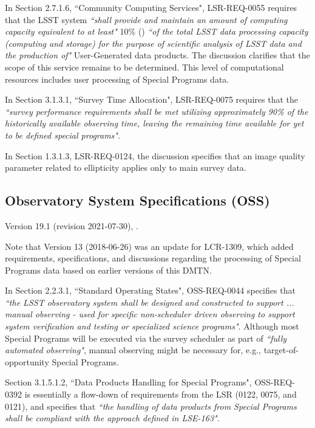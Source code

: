 In Section 2.7.1.6, ``Community Computing Services", LSR-REQ-0055 requires that the LSST system {\it ``shall provide and maintain an amount of computing capacity equivalent to at least"} 10\% () {\it ``of the total LSST data processing capacity (computing and storage) for the purpose of scientific analysis of LSST data and the production of"} User-Generated data products. 
The discussion clarifies that the scope of this service remains to be determined.
This level of computational resources includes user processing of Special Programs data.

In Section 3.1.3.1, ``Survey Time Allocation", LSR-REQ-0075 requires that the {\it ``survey performance requirements shall be met utilizing approximately 90\% of the historically available observing time, leaving the remaining time available for yet to be defined special programs"}.

In Section 1.3.1.3, LSR-REQ-0124, the discussion specifies that an image quality parameter related to ellipticity applies only to main survey data.



\subsection{Observatory System Specifications (OSS)}

Version 19.1 (revision 2021-07-30), .

Note that Version 13 (2018-06-26) was an update for LCR-1309, which added requirements, specifications, and discussions regarding the processing of Special Programs data based on earlier versions of this DMTN.

In Section 2.2.3.1, ``Standard Operating States", OSS-REQ-0044 specifies that {\it ``the LSST observatory system shall be designed and constructed to support ... manual observing - used for specific non-scheduler driven observing to support system verification and testing or specialized science programs"}.
Although most Special Programs will be executed via the survey scheduler as part of {\it ``fully automated observing"}, manual observing might be necessary for, e.g., target-of-opportunity Special Programs.

Section 3.1.5.1.2, ``Data Products Handling for Special Programs", OSS-REQ-0392 is essentially a flow-down of requirements from the LSR (0122, 0075, and 0121), and specifies that {\it ``the handling of data products from Special Programs shall be compliant with the approach defined in LSE-163"}.

